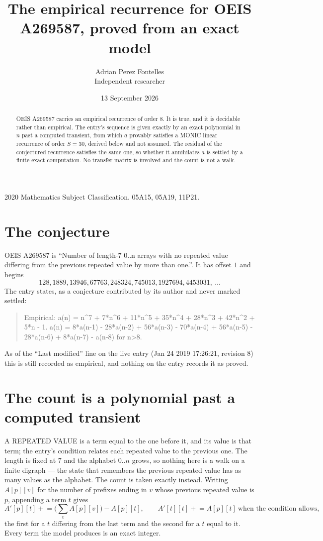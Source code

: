 \documentclass[11pt,a4paper]{article}
\title{The empirical recurrence for OEIS A269587, proved from an exact model}
\author{Adrian Perez Fontelles\\ \small Independent researcher}
\date{13 September 2026}
\theoremstyle{plain}
\theoremstyle{definition}
\begin{document}
\maketitle

\begin{abstract}
OEIS A269587 carries an empirical recurrence of order $8$. It is true, and it is
decidable rather than empirical. The entry's sequence is given exactly by an exact polynomial in $n$ past a computed transient, from
which $a$ provably satisfies a MONIC linear recurrence of order $S=30$, derived below and not
assumed. The residual of the conjectured recurrence satisfies the same one, so whether it
annihilates $a$ is settled by a finite exact computation. No transfer matrix is involved and
the count is not a walk.
\end{abstract}

\noindent\small 2020 Mathematics Subject Classification. 05A15, 05A19, 11P21.\normalsize

\section{The conjecture}

OEIS A269587 is ``Number of length-7 0..n arrays with no repeated value differing from the previous repeated value by more than one.''. It has offset $1$ and begins
\[
128, 1889, 13946, 67763, 248324, 745013, 1927694, 4453031,\ \dots
\]
The entry states, as a conjecture contributed by its author and never marked settled:
\begin{quote}
Empirical: a(n) = n\^{}7 + 7*n\^{}6 + 11*n\^{}5 + 35*n\^{}4 + 28*n\^{}3 + 42*n\^{}2 + 5*n - 1. a(n) = 8*a(n-1) - 28*a(n-2) + 56*a(n-3) - 70*a(n-4) + 56*a(n-5) - 28*a(n-6) + 8*a(n-7) - a(n-8) for n>8.
\end{quote}
As of the ``Last modified'' line on the live entry (Jan 24 2019 17:26:21, revision 8)
this is still recorded as empirical, and nothing on the entry records it as proved.

\section{The count is a polynomial past a computed transient}

A REPEATED VALUE is a term equal to the one before it, and its value is that term; the entry's
condition relates each repeated value to the previous one. The length is fixed at $7$ and the
alphabet $0..n$ grows, so nothing here is a walk on a finite digraph --- the state that
remembers the previous repeated value has as many values as the alphabet. The count is taken
exactly instead. Writing $A[p][v]$ for the number of prefixes ending in $v$ whose previous
repeated value is $p$, appending a term $t$ gives
\[
A'[p][t] \mathrel{+}= \Big(\sum_v A[p][v]\Big) - A[p][t],
\qquad
A'[t][t] \mathrel{+}= A[p][t]\ \text{when the condition allows},
\]
the first for a $t$ differing from the last term and the second for a $t$ equal to it. Every
term the model produces is an exact integer.
\end{document}
